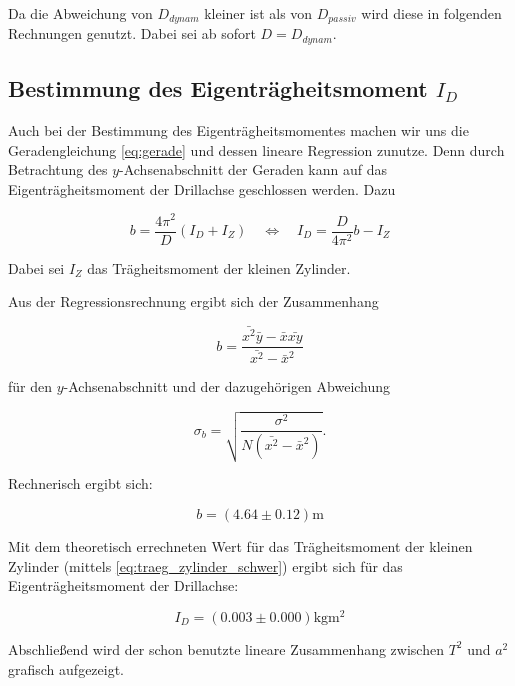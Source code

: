 Da die Abweichung von $D_{dynam}$ kleiner ist als von $D_{passiv}$ wird
diese in folgenden Rechnungen genutzt.
Dabei sei ab sofort $D=D_{dynam}$.


\subsection{Bestimmung des Eigenträgheitsmoment $I_D$}

Auch bei der Bestimmung des Eigenträgheitsmomentes machen wir uns die
Geradengleichung \eqref{eq:gerade} und dessen lineare Regression zunutze.
Denn durch Betrachtung des $y$-Achsenabschnitt der Geraden kann auf das Eigenträgheitsmoment der Drillachse geschlossen werden. %
Dazu

\begin{equation*}
b=\frac{4\pi^2}{D}\left(I_D+I_Z\right) \quad \Leftrightarrow \quad I_D=\frac{D}{4\pi^2}b-I_Z
\end{equation*}

Dabei sei $I_Z$ das Trägheitsmoment der kleinen Zylinder.%

Aus der Regressionsrechnung ergibt sich der Zusammenhang

\begin{equation*}
b=\frac{\bar{x^2}\bar{y}-\bar{x}\bar{xy}}{\bar{x^2}-\bar{x}^2}
\end{equation*}

für den $y$-Achsenabschnitt und der dazugehörigen Abweichung

\begin{equation*}
\sigma_b=\sqrt{\frac{\sigma^2}{N\left(\bar{x^2}-\bar{x}^2\right)}}.
\end{equation*}

Rechnerisch ergibt sich:

\begin{equation}
\label{eq:y_achsenabschnitt}
b=\left(\num{4.64}\pm\num{0.12}\right) \si{\meter}
\end{equation}

Mit dem theoretisch errechneten Wert für das Trägheitsmoment der kleinen Zylinder
(mittels \eqref{eq:traeg_zylinder_schwer}) ergibt sich für das
Eigenträgheitsmoment der Drillachse:

\begin{equation}
\label{eq:eigentraegheitsmoment}
I_D=\left(\num{0.003}\pm\num{0.000}\right) \si{\kilogram\meter\squared}
\end{equation}


Abschließend wird der schon benutzte lineare Zusammenhang zwischen $T^2$ und $a^2$ grafisch aufgezeigt.

